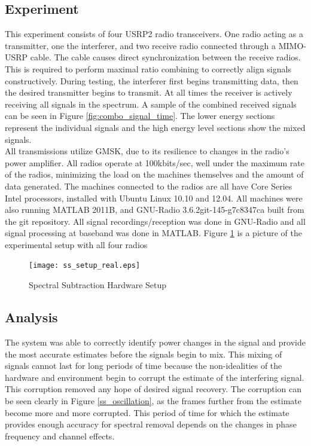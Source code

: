 \subsection{Experiment}

This experiment consists of four USRP2 radio transceivers.  One radio acting as a transmitter, one the interferer, and two receive radio connected through a MIMO-USRP cable.  The cable causes direct synchronization between the receive radios.  This is required to perform maximal ratio combining to correctly align signals constructively.  During testing, the interferer first begins transmitting data, then the desired transmitter begins to transmit.  At all times the receiver is actively receiving all signals in the spectrum.  A sample of the combined received signals can be seen in Figure \ref{fig:combo_signal_time}.  The lower energy sections represent the individual signals and the high energy level sections show the mixed signals.\\


All transmissions utilize GMSK, due to its resilience to changes in the radio's power amplifier.  All radios operate at 100kbits/sec, well under the maximum rate of the radios, minimizing the load on the machines themselves and the amount of data generated.  The machines connected to the radios are all have Core Series Intel processors, installed with Ubuntu Linux 10.10 and 12.04.  All machines were also running MATLAB 2011B, and GNU-Radio 3.6.2git-145-g7c8347ca built from the git repository.  All signal recordings/reception was done in GNU-Radio and all signal processing at baseband was done in MATLAB.  Figure \ref{ss_setup_real} is a picture of the experimental setup with all four radios

\begin{figure}\label{ss_setup_real}
\centering
\texttt{[image: ss\_setup\_real.eps]}
\caption{Spectral Subtraction Hardware Setup}
\end{figure}

\subsection{Analysis}

The system was able to correctly identify power changes in the signal and provide the most accurate estimates before the signals begin to mix.  This mixing of signals cannot last for long periods of time because the non-idealities of the hardware and environment begin to corrupt the estimate of the interfering signal.  This corruption removed any hope of desired signal recovery.  The corruption can be seen clearly in Figure \ref{ss_oscillation}, as the frames further from the estimate become more and more corrupted.  This period of time for which the estimate provides enough accuracy for spectral removal depends on the changes in phase frequency and channel effects.\\


